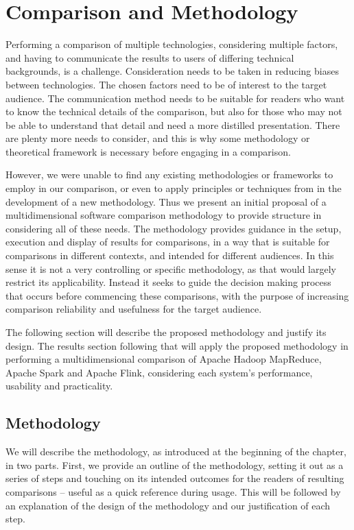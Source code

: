 \chapter{Comparison and Methodology}
\label{COMPARISON}

  Performing a comparison of multiple technologies, considering multiple factors, and having to communicate the results to users of differing technical backgrounds, is a challenge. Consideration needs to be taken in reducing biases between technologies. The chosen factors need to be of interest to the target audience. The communication method needs to be suitable for readers who want to know the technical details of the comparison, but also for those who may not be able to understand that detail and need a more distilled presentation. There are plenty more needs to consider, and this is why some methodology or theoretical framework is necessary before engaging in a comparison.

  However, we were unable to find any existing methodologies or frameworks to employ in our comparison, or even to apply principles or techniques from in the development of a new methodology. Thus we present an initial proposal of a multidimensional software comparison methodology to provide structure in considering all of these needs. The methodology provides guidance in the setup, execution and display of results for comparisons, in a way that is suitable for comparisons in different contexts, and intended for different audiences. In this sense it is not a very controlling or specific methodology, as that would largely restrict its applicability. Instead it seeks to guide the decision making process that occurs before commencing these comparisons, with the purpose of increasing comparison reliability and usefulness for the target audience.

  The following section will describe the proposed methodology and justify its design. The results section following that will apply the proposed methodology in performing a multidimensional comparison of Apache Hadoop MapReduce, Apache Spark and Apache Flink, considering each system's performance, usability and practicality.


\section{Methodology}

  We will describe the methodology, as introduced at the beginning of the chapter, in two parts. First, we provide an outline of the methodology, setting it out as a series of steps and touching on its intended outcomes for the readers of resulting comparisons -- useful as a quick reference during usage. This will be followed by an explanation of the design of the methodology and our justification of each step.


